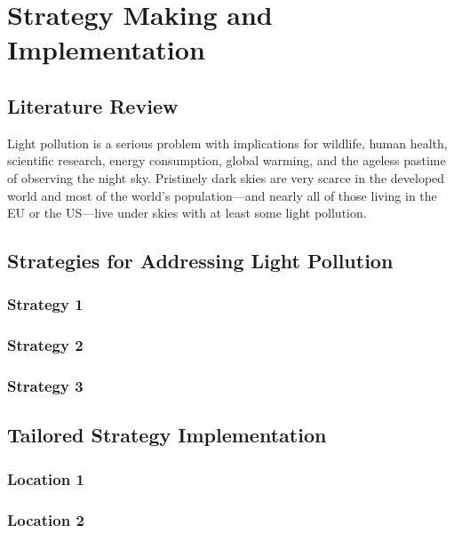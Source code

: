 \MinParskip{}

\section{Strategy Making and Implementation}


\subsection{Literature Review}
Light pollution is a serious problem with implications for wildlife, human health, scientific research, energy consumption, global warming, and the ageless pastime of observing the night sky. Pristinely dark skies are very scarce in the developed world and most of the world's population—and nearly all of those living in the EU or the US—live under skies with at least some light pollution. 

\subsection{Strategies for Addressing Light Pollution}

\subsubsection{Strategy 1}

\subsubsection{Strategy 2}

\subsubsection{Strategy 3}


\subsection{Tailored Strategy Implementation}

\subsubsection{Location 1}

\subsubsection{Location 2}


